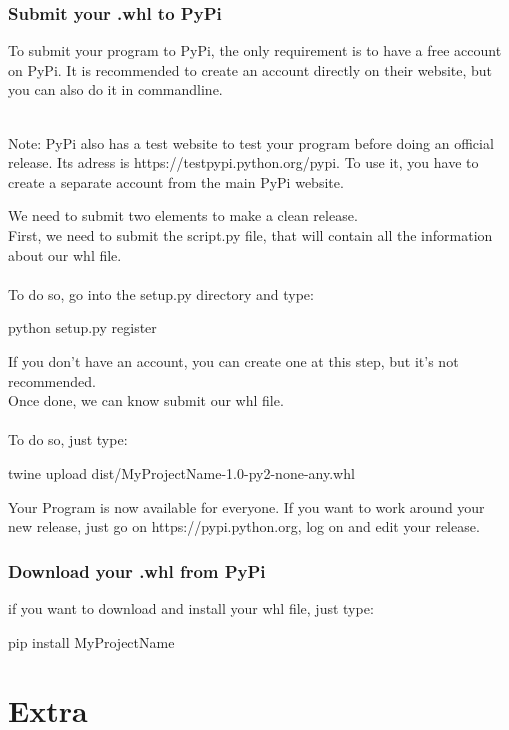 \documentclass[10pt,letterpaper]{article}
\begin{document}
\section {Submit your .whl to PyPi}
To submit your program to PyPi, the only requirement is to have a free account on PyPi. It is recommended to create an account directly on their website, but you can also do it in commandline.\\
\begin{itshape}
\\Note: PyPi also has a test website to test your program before doing an official release. Its adress is https://testpypi.python.org/pypi. To use it, you have to create a separate account from the main PyPi website.\\
\end{itshape}
We need to submit two elements to make a clean release.\\
First, we need to submit the script.py file, that will contain all the information about our whl file.\\
\\To do so, go into the  setup.py directory and type:
\begin{mdframed}[backgroundcolor=black, fontcolor=white]
python setup.py register
\end{mdframed}
If you don't have an account, you can create one at this step, but it's not recommended.\\
Once done, we can know submit our whl file.\\
\\To do so, just type:
\begin{mdframed}[backgroundcolor=black, fontcolor=white]
twine upload dist/MyProjectName-1.0-py2-none-any.whl
\end{mdframed}
Your Program is now available for everyone. If you want to work around your new release, just go on https://pypi.python.org, log on and edit your release.
\section {Download your .whl from PyPi}
if you want to download and install your whl file, just type:
\begin{mdframed}[backgroundcolor=black, fontcolor=white]
pip install MyProjectName
\end{mdframed}
\setcounter{section}{0}
\newpage
\part {Extra}
\end{document}
